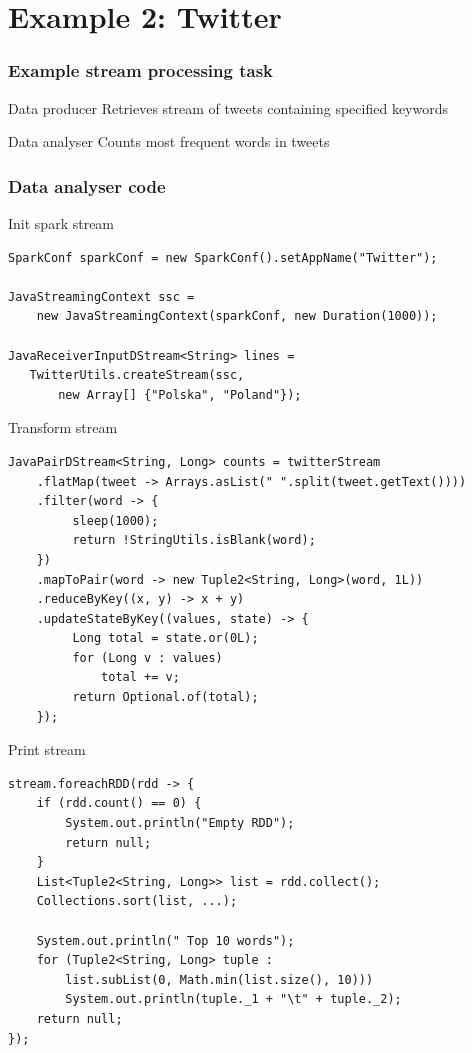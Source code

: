\documentclass{beamer}
\begin{document}
\section{Example 2: Twitter}
\begin{frame}
\frametitle{Example stream processing task}
\begin{block}{Data producer}
	Retrieves stream of tweets containing specified keywords
\end{block}
\begin{block}{Data analyser}
	Counts most frequent words in tweets
\end{block}
\end{frame}

\begin{frame}
\frametitle{Data analyser code}
\begin{block}{Init spark stream}
\begin{lstlisting}
SparkConf sparkConf = new SparkConf().setAppName("Twitter");

JavaStreamingContext ssc = 
    new JavaStreamingContext(sparkConf, new Duration(1000));
    
JavaReceiverInputDStream<String> lines = 
   TwitterUtils.createStream(ssc, 
       new Array[] {"Polska", "Poland"});
\end{lstlisting}
\end{block}

\begin{block}{Transform stream}
\begin{lstlisting}
JavaPairDStream<String, Long> counts = twitterStream
    .flatMap(tweet -> Arrays.asList(" ".split(tweet.getText())))
    .filter(word -> {
         sleep(1000);
         return !StringUtils.isBlank(word);
    })
    .mapToPair(word -> new Tuple2<String, Long>(word, 1L))
    .reduceByKey((x, y) -> x + y)
    .updateStateByKey((values, state) -> {
         Long total = state.or(0L);
         for (Long v : values)
             total += v;
         return Optional.of(total);
    });
\end{lstlisting}
\end{block}

\begin{block}{Print stream}
\begin{lstlisting}
stream.foreachRDD(rdd -> {
    if (rdd.count() == 0) {
        System.out.println("Empty RDD");
        return null;
    }
    List<Tuple2<String, Long>> list = rdd.collect();
    Collections.sort(list, ...);
    
    System.out.println(" Top 10 words");
    for (Tuple2<String, Long> tuple : 
        list.subList(0, Math.min(list.size(), 10)))
        System.out.println(tuple._1 + "\t" + tuple._2);
    return null;
});
\end{lstlisting}
\end{block}

\end{frame}
\end{document}
